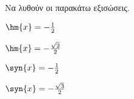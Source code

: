 Να λυθούν οι παρακάτω εξισώσεις.
\begin{multicols}{2}
\begin{alist}
\item $ \hm{x}=-\frac{1}{2} $
\item $ \hm{x}=-\frac{\sqrt{2}}{2} $
\item $ \syn{x}=-\frac{1}{2} $
\item $ \syn{x}=-\frac{\sqrt{3}}{2} $
\end{alist}
\end{multicols}

